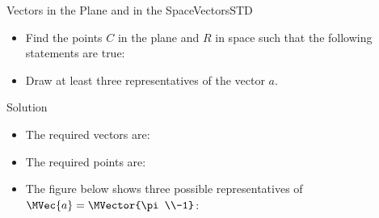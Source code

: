 \begin{MXContent}{Vectors in the Plane and in the Space}{Vectors}{STD}
\begin{MExercise}
\begin{itemize}
\item Find the points $C$ in the plane and $R$ in space such that the following statements are true:\\

\item Draw at least three representatives of the vector $a$.
\end{itemize}


\begin{MHint}{Solution}
\begin{itemize}
 \item The required vectors are:\\
 \item The required points are:\\
 \item The figure below shows three possible representatives of $\MVec{a}=\MVector{\pi\\-1}$:
 

\end{itemize}
\end{MHint}
\end{MExercise}
\end{MXContent}
